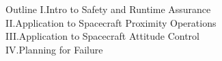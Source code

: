 \begin{frame}{Outline}
  \vfill
  {\color{slate900}\large
  I.\quad Intro to Safety and Runtime Assurance\\[12pt]
  II.\quad Application to Spacecraft Proximity Operations\\[12pt]
  III.\quad Application to Spacecraft Attitude Control\\[12pt]
  IV.\quad Planning for Failure
  }
  \vfill
\end{frame}
